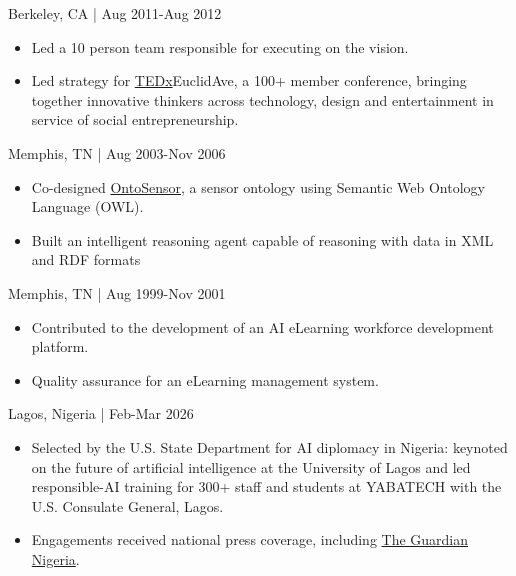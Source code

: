\documentclass[11pt,article,oneside]{memoir}
\begin{document}
 \hfill Berkeley, CA | Aug 2011-Aug 2012
\begin{itemize}[noitemsep,nolistsep]
\item[-]Led a 10 person team responsible for executing on the vision.
\item[-]Led strategy for \href{http://www.ted.com/tedx/events/3790}{TEDx}EuclidAve, a 100+ member conference, bringing together innovative thinkers across technology, design and entertainment in service of social entrepreneurship.
\end{itemize}

 \hfill Memphis, TN | Aug 2003-Nov 2006
\begin{itemize}[nolistsep]
\item[-]Co-designed \href{https://scholar.google.com/scholar?hl=en&q=Building+a+Sensor+Ontology\%3A+A+Practical+Approach+Leveraging+ISO+and+OGC+Models.&btnG=&as_sdt=1\%2C43&as_sdtp=}{OntoSensor}, a sensor ontology using Semantic Web Ontology Language (OWL).
\item[-]Built an intelligent reasoning agent capable of reasoning with data in XML and RDF formats
\end{itemize}

 \hfill Memphis, TN | Aug 1999-Nov 2001
\begin{itemize}[nolistsep]
\item[-]Contributed to the development of an AI eLearning workforce development platform.
\item[-]Quality assurance for an eLearning management system.
\end{itemize}

\bigskip

\medskip

 \hfill Lagos, Nigeria | Feb-Mar 2026
\begin{itemize}[nolistsep]
\item[-]Selected by the U.S. State Department for AI diplomacy in Nigeria: keynoted on the future of artificial intelligence at the University of Lagos and led responsible-AI training for 300+ staff and students at YABATECH with the U.S. Consulate General, Lagos.
\item[-]Engagements received national press coverage, including \href{https://guardian.ng/education/u-s-consulate-yabatech-train-300-staff-students-on-ai/}{The Guardian Nigeria}.
\end{itemize}
\end{document}
